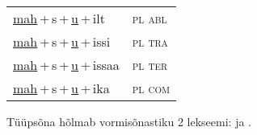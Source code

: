 \begin{minipage}{\textwidth}
\begin{sideways}
\begin{tabular}{l l}
\underline{mah}\,+\,s\,+\,\underline{u}\,+\,ilt & \textsc{ pl abl } \\
\underline{mah}\,+\,s\,+\,\underline{u}\,+\,issi & \textsc{ pl tra } \\
\underline{mah}\,+\,s\,+\,\underline{u}\,+\,issaa & \textsc{ pl ter } \\
\underline{mah}\,+\,s\,+\,\underline{u}\,+\,ika & \textsc{ pl com } \\
\end{tabular}
\end{sideways}
\label{tab:tüüpsõnamall-mahsu}

\end{minipage}

 
\vspace{1em}
\noindent Tüüpsõna hõlmab vormisõnastiku 2 lekseemi:  ja .
